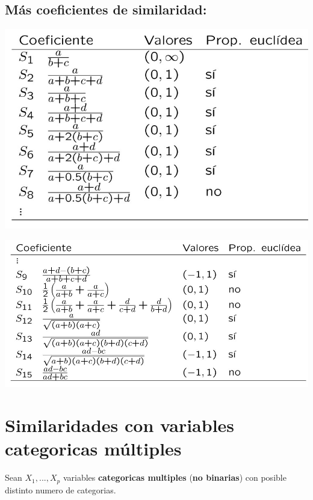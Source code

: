 \documentclass[12pt]{report} %
\begin{document}
\newpage











\subsection{Más coeficientes de similaridad:}


\includegraphics[scale=0.7]{similaridades 1.jpg}

\includegraphics[scale=0.7]{similaridades 2.jpg}

\newpage

\section{Similaridades con variables categoricas múltiples}

Sean $X_1,...,X_p$ variables \textbf{categoricas multiples} (\textbf{no binarias}) con posible distinto numero de categorias.
\end{document}
